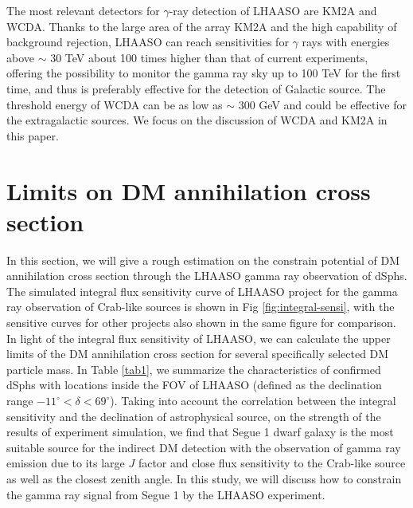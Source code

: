 \documentclass[12pt,prd,showpacs,amsmath,amssymb,aps,floats,floatfix,nofootinbib]{revtex4-1}
\begin{document}
The most relevant detectors for $\gamma$-ray detection of LHAASO are KM2A and WCDA. Thanks to the large area of the array KM2A and the high capability of background rejection, LHAASO can reach sensitivities for $\gamma$ rays with energies above $\sim$ 30 TeV about 100 times higher than that of current experiments, offering the possibility to monitor the gamma ray sky up to 100 TeV for the first time,
and thus is preferably effective for the detection of Galactic source.
The threshold energy of WCDA can be as low as $\sim$ 300 GeV and could be effective for the extragalactic sources.
We focus on the discussion of WCDA and KM2A in this paper.

\section{Limits on DM annihilation cross section}\label{sec 3}
In this section, we will give a rough estimation on the constrain potential of DM annihilation cross section through the LHAASO gamma ray observation of dSphs.
The simulated integral flux sensitivity curve of LHAASO project for the gamma ray observation of Crab-like sources is shown in Fig \ref{fig:integral-sensi}, with the sensitive curves for other projects also shown in the same figure for comparison.
In light of the integral flux sensitivity of LHAASO, we can calculate the upper limits of the DM annihilation cross section for several specifically selected DM particle mass. In Table \ref{tab1}, we summarize the characteristics of confirmed dSphs with locations inside the FOV of LHAASO (defined as the declination range $-11^{\circ}<\delta<69^{\circ}$). Taking into account the correlation between the integral sensitivity and the declination of astrophysical source, on the strength of the results of experiment simulation, we find that Segue 1 dwarf galaxy is the most suitable source for the indirect DM detection with the observation of gamma ray emission due to its large $J$ factor and close flux sensitivity to the Crab-like source as well as the closest zenith angle.
In this study, we will discuss how to constrain the gamma ray signal from Segue 1 by the LHAASO experiment.
\end{document}
